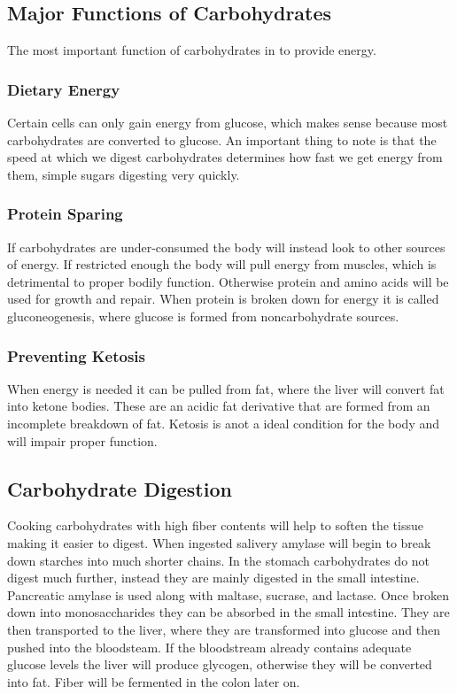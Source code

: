 \documentclass[letterpaper, 11pt]{article}
\begin{document}
\subsection{Major Functions of Carbohydrates}
\label{sec:org30b91a6}
The most important function of carbohydrates in to provide energy.\\
\subsubsection{Dietary Energy}
\label{sec:orgca077cf}
Certain cells can only gain energy from glucose, which makes sense because most carbohydrates are converted to glucose. An important thing to note is that the speed at which we digest carbohydrates determines how fast we get energy from them, simple sugars digesting very quickly.\\
\subsubsection{Protein Sparing}
\label{sec:org71b99af}
If carbohydrates are under-consumed the body will instead look to other sources of energy. If restricted enough the body will pull energy from muscles, which is detrimental to proper bodily function. Otherwise protein and amino acids will be used for growth and repair. When protein is broken down for energy it is called gluconeogenesis, where glucose is formed from noncarbohydrate sources.\\
\subsubsection{Preventing Ketosis}
\label{sec:org295ecbb}
When energy is needed it can be pulled from fat, where the liver will convert fat into ketone bodies. These are an acidic fat derivative that are formed from an incomplete breakdown of fat. Ketosis is anot a ideal condition for the body and will impair proper function.\\
\subsection{Carbohydrate Digestion}
\label{sec:org1e8affb}
Cooking carbohydrates with high fiber contents will help to soften the tissue making it easier to digest. When ingested salivery amylase will begin to break down starches into much shorter chains. In the stomach carbohydrates do not digest much further, instead they are mainly digested in the small intestine. Pancreatic amylase is used along with maltase, sucrase, and lactase. Once broken down into monosaccharides they can be absorbed in the small intestine. They are then transported to the liver, where they are transformed into glucose and then pushed into the bloodsteam. If the bloodstream already contains adequate glucose levels the liver will produce glycogen, otherwise they will be converted into fat. Fiber will be fermented in the colon later on.\\
\end{document}
